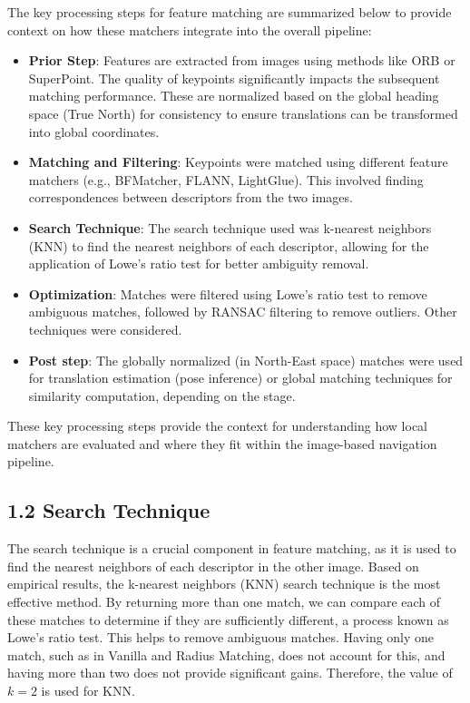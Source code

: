The key processing steps for feature matching are summarized below to provide context on how these matchers integrate into the overall pipeline:

\begin{itemize}
    \item \textbf{Prior Step}: Features are extracted from images using methods like ORB or SuperPoint. The quality of keypoints significantly impacts the subsequent matching performance. These are normalized based on the global heading space (True North) for consistency to ensure translations can be transformed into global coordinates.
    \item \textbf{Matching and Filtering}: Keypoints were matched using different feature matchers (e.g., BFMatcher, FLANN, LightGlue). This involved finding correspondences between descriptors from the two images.
    \item \textbf{Search Technique}: The search technique used was k-nearest neighbors (KNN) to find the nearest neighbors of each descriptor, allowing for the application of Lowe's ratio test for better ambiguity removal.
    \item \textbf{Optimization}: Matches were filtered using Lowe's ratio test to remove ambiguous matches, followed by RANSAC filtering to remove outliers. Other techniques were considered.
    \item \textbf{Post step}: The globally normalized (in North-East space) matches were used for translation estimation (pose inference) or global matching techniques for similarity computation, depending on the stage. 
\end{itemize}

These key processing steps provide the context for understanding how local matchers are evaluated and where they fit within the image-based navigation pipeline.

\subsection*{1.2 Search Technique}

The search technique is a crucial component in feature matching, as it is used to find the nearest neighbors of each descriptor in the other image. Based on empirical results, the k-nearest neighbors (KNN) search technique is the most effective method. By returning more than one match, we can compare each of these matches to determine if they are sufficiently different, a process known as Lowe's ratio test. This helps to remove ambiguous matches. Having only one match, such as in Vanilla and Radius Matching, does not account for this, and having more than two does not provide significant gains. Therefore, the value of $k=2$ is used for KNN.

